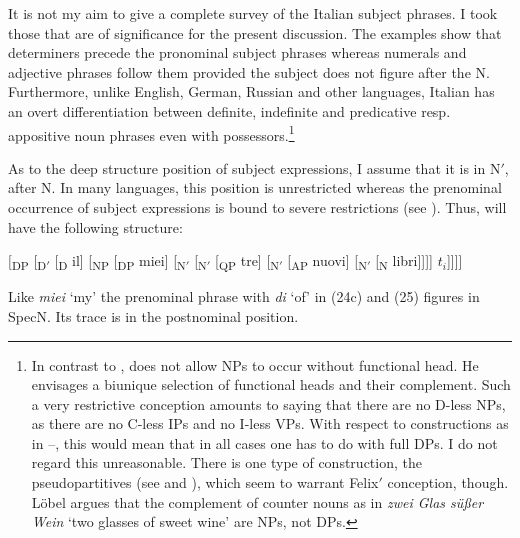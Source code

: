 \documentclass[output=paper,colorlinks,citecolor=brown]{langscibook}
\begin{document}
\noindent It is not my aim to give a complete survey of the Italian subject phrases. I took those that are of significance for the present discussion. The examples show that determiners precede the pronominal subject phrases whereas numerals and adjective phrases follow them provided the subject does not figure after the N. Furthermore, unlike English, German, Russian and other languages, Italian has an overt differentiation between definite, indefinite and predicative resp. appositive noun phrases even with possessors.\footnote{In contrast to \citet{Delsing88The-Scandinavian}, \citet{Felix88Structure-functional} does not allow NPs to occur without functional head. He envisages a biunique selection of functional heads and their complement. Such a very restrictive conception amounts to saying that there are no D-less NPs, as there are no C-less IPs and no I-less VPs. With respect to constructions as in --, this would mean that in all cases one has to do with full DPs. I do not regard this unreasonable. There is one type of construction, the pseudopartitives (see \citealt{Lobel88D-und-Q, Lobel89Q-as-functional} and \citealt{Burchert90Zur-Syntax}), which seem to warrant Felix$'$ conception, though. Löbel argues that the complement of counter nouns as in \textit{zwei Glas süßer Wein} `two glasses of sweet wine' are NPs, not DPs.}

As to the deep structure position of subject expressions, I assume that it is in N$'$, after N. In many languages, this position is unrestricted whereas the prenominal occurrence of subject expressions is bound to severe restrictions (see \citealt{Bhatt90Die-syntaktische}). Thus,  will have the following structure:

\ea \label{ex:zi91:28} $[$\textsubscript{DP} [\textsubscript{D$'$} [\textsubscript{D} il] [\textsubscript{NP} [\textsubscript{DP} miei] [\textsubscript{N$'$} [\textsubscript{N$'$} [\textsubscript{QP} tre] [\textsubscript{N$'$} [\textsubscript{AP} nuovi] [\textsubscript{N$'$} [\textsubscript{N} libri]]]] $t_i$]]]]
\z

\noindent Like \textit{miei} `my' the prenominal phrase with \textit{di} `of' in (24c) and (25) figures in SpecN. Its trace is in the postnominal position.
\end{document}
